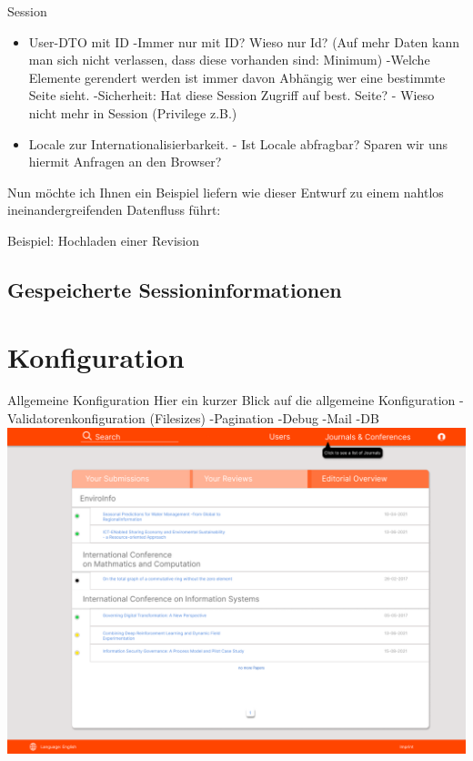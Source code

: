 \documentclass{beamer}
\begin{document}
    \begin{frame}{Session}
        \begin{itemize}
            \item User-DTO mit ID
            -Immer nur mit ID? Wieso nur Id? (Auf mehr Daten kann man sich nicht verlassen, dass diese vorhanden sind: Minimum)
            -Welche Elemente gerendert werden ist immer davon Abhängig wer eine bestimmte Seite sieht.
            -Sicherheit: Hat diese Session Zugriff auf best. Seite?
            - Wieso nicht mehr in Session (Privilege z.B.)
            \pause
            \item Locale zur Internationalisierbarkeit.
            - Ist Locale abfragbar? Sparen wir uns hiermit Anfragen an den Browser?
        \end{itemize}

        Nun möchte ich Ihnen ein Beispiel liefern wie dieser Entwurf zu einem nahtlos ineinandergreifenden
        Datenfluss führt:
        \begin{frame}{Beispiel: Hochladen einer Revision}
        \end{frame}
    \end{frame}

    \subsection{Gespeicherte Sessioninformationen}


    \section{Konfiguration}
    \begin{frame}{Allgemeine Konfiguration}
        Hier ein kurzer Blick auf die allgemeine Konfiguration
        -Validatorenkonfiguration (Filesizes)
        -Pagination
        -Debug
        -Mail
        -DB
        \centering
        \includegraphics[height=0.75\textheight]{../../docs/Pflichtenheft/graphics/Homepage-png}
    \end{frame}
\end{document}
